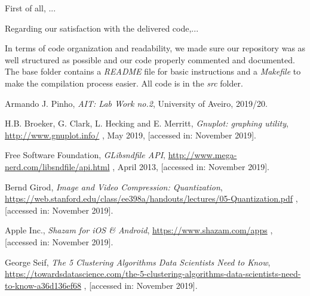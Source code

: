 \documentclass[12pt]{article}
\begin{document}
First of all, ...

Regarding our satisfaction with the delivered code,...

In terms of code organization and readability, we made sure our 
repository was as well structured as possible and our code properly commented
and documented.
The base folder contains a {\it README\/} file for basic instructions and a 
{\it Makefile\/} to make the compilation process easier.
All code is in the {\it src\/} folder.

\begin{thebibliography}{9}
  

    Armando J. Pinho,
    \textit{AIT: Lab Work no.2},
    University of Aveiro,
    2019/20.
  
    H.B. Broeker, G. Clark, L. Hecking and E. Merritt,
    \textit{Gnuplot: graphing utility},
    \url{http://www.gnuplot.info/} ,
    May 2019,
    [accessed in: November 2019].

    Free Software Foundation,
    \textit{GLibsndfile API},
    \url{http://www.mega-nerd.com/libsndfile/api.html} ,
    April 2013,
    [accessed in: November 2019].

    Bernd Girod,
    \textit{Image and Video Compression: Quantization},
    \url{https://web.stanford.edu/class/ee398a/handouts/lectures/05-Quantization.pdf} ,
    [accessed in: November 2019].

    Apple Inc.,
    \textit{Shazam for iOS \& Android},
    \url{https://www.shazam.com/apps} ,
    [accessed in: November 2019].

    George Seif,
    \textit{The 5 Clustering Algorithms Data Scientists Need to Know},
    \url{https://towardsdatascience.com/the-5-clustering-algorithms-data-scientists-need-to-know-a36d136ef68} ,
    [accessed in: November 2019].

\end{thebibliography}

\clearpage
\end{document}
